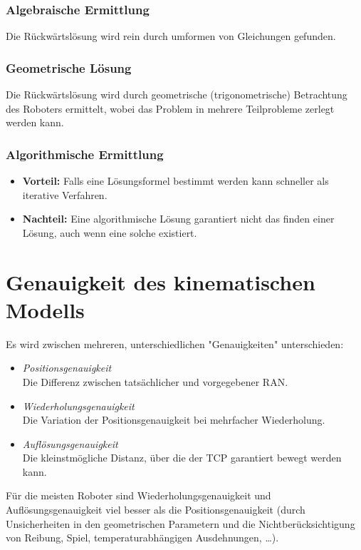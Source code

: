 			\subsubsection{Algebraische Ermittlung}
				Die Rückwärtslösung wird rein durch umformen von Gleichungen gefunden.

			\subsubsection{Geometrische Lösung}
				Die Rückwärtslösung wird durch geometrische (\bspw trigonometrische) Betrachtung des Roboters ermittelt, wobei das Problem in mehrere Teilprobleme zerlegt werden kann.

			\subsubsection{Algorithmische Ermittlung}
				\begin{itemize}
					\item \textbf{Vorteil:} Falls eine Lösungsformel bestimmt werden kann schneller als iterative Verfahren.
					\item \textbf{Nachteil:} Eine algorithmische Lösung garantiert nicht das finden einer Lösung, auch wenn eine solche existiert.
				\end{itemize}

	\section{Genauigkeit des kinematischen Modells}
		Es wird zwischen mehreren, unterschiedlichen "Genauigkeiten" unterschieden:
		\begin{itemize}
			\item \emph{Positionsgenauigkeit} \\ Die Differenz zwischen tatsächlicher und vorgegebener RAN.
			\item \emph{Wiederholungsgenauigkeit} \\ Die Variation der Positionsgenauigkeit bei mehrfacher Wiederholung.
			\item \emph{Auflösungsgenauigkeit} \\ Die kleinstmögliche Distanz, über die der TCP garantiert bewegt werden kann.
		\end{itemize}
		Für die meisten Roboter sind Wiederholungsgenauigkeit und Auflösungsgenauigkeit viel besser als die Positionsgenauigkeit (\zB durch Unsicherheiten in den geometrischen Parametern und die Nichtberücksichtigung von Reibung, Spiel, temperaturabhängigen Ausdehnungen, \dots).

